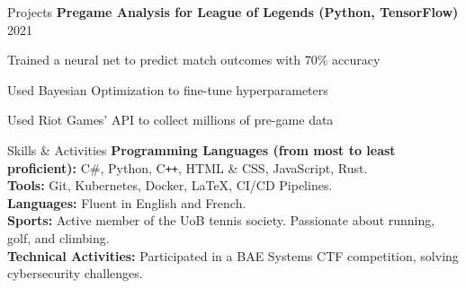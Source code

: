 \documentclass{resume} %
\let\olditemize\itemize
\let\endolditemize\enditemize
\renewenvironment{itemize}{
  \vspace*{-6pt} %
  \olditemize
  \setlength{\itemsep}{0pt}
  \setlength{\topsep}{0pt}         %
  \setlength{\partopsep}{0pt}      %
  \setlength{\parsep}{0pt}         %
  \setlength{\parskip}{0pt}        %
  \setlength{\leftmargin}{1em}
}{
  \endolditemize
  \vspace*{-6pt} %
}
\begin{document}
\begin{rSection}{Projects}
\textbf{Pregame Analysis for League of Legends (Python, TensorFlow)} \hfill 2021
\begin{itemize}
    \item Trained a neural net to predict match outcomes with 70\% accuracy
    \item Used Bayesian Optimization to fine-tune hyperparameters
    \item Used Riot Games' API to collect millions of pre-game data
\end{itemize}

\end{rSection}


\begin{rSection}{Skills \& Activities}
\textbf{Programming Languages (from most to least proficient):} C\#, Python, C\texttt{++}, HTML \& CSS, JavaScript, Rust. \\
\textbf{Tools:} Git, Kubernetes, Docker, LaTeX, CI/CD Pipelines. \\
\textbf{Languages:} Fluent in English and French. \\
\textbf{Sports:} Active member of the UoB tennis society. Passionate about running, golf, and climbing.\\
\textbf{Technical Activities:} Participated in a BAE Systems CTF competition, solving cybersecurity challenges.

\end{rSection}
\end{document}
